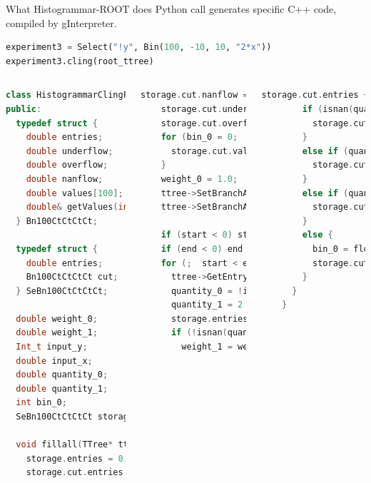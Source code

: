 \documentclass{beamer}
\begin{document}
\begin{frame}[fragile]{What Histogrammar-ROOT does}
\vspace{0.35 cm}
Python call generates specific C++ code, compiled by gInterpreter.

\begin{lstlisting}[language=python]
experiment3 = Select("!y", Bin(100, -10, 10, "2*x"))
experiment3.cling(root_ttree)
\end{lstlisting}

\begin{columns}
\begin{lstlisting}[language=cpp, basicstyle=\ttfamily\fontsize{5}{4}\selectfont]
class HistogrammarClingFiller_0 {
public:
  typedef struct {
    double entries;
    double underflow;
    double overflow;
    double nanflow;
    double values[100];
    double& getValues(int i) { return values[i]; }
  } Bn100CtCtCtCt;

  typedef struct {
    double entries;
    Bn100CtCtCtCt cut;
  } SeBn100CtCtCtCt;

  double weight_0;
  double weight_1;
  Int_t input_y;
  double input_x;
  double quantity_0;
  double quantity_1;
  int bin_0;
  SeBn100CtCtCtCt storage;

  void fillall(TTree* ttree, Long64_t start, Long64_t end) {
    storage.entries = 0.0;
    storage.cut.entries = 0.0;
\end{lstlisting}

\begin{lstlisting}[language=cpp, basicstyle=\ttfamily\fontsize{5}{4}\selectfont]
    storage.cut.nanflow = 0.0;
    storage.cut.underflow = 0.0;
    storage.cut.overflow = 0.0;
    for (bin_0 = 0;  bin_0 < 100;  ++bin_0) {
      storage.cut.values[bin_0] = 0.0;
    }
    weight_0 = 1.0;
    ttree->SetBranchAddress("x", &input_x);
    ttree->SetBranchAddress("y", &input_y);

    if (start < 0) start = 0;
    if (end < 0) end = ttree->GetEntries();
    for (;  start < end;  ++start) {
      ttree->GetEntry(start);
      quantity_0 = !input_y;
      quantity_1 = 2 * input_x;
      storage.entries += weight_0;
      if (!isnan(quantity_0)  &&  quantity_0 > 0.0) {
        weight_1 = weight_0 * quantity_0;
\end{lstlisting}

\begin{lstlisting}[language=cpp, basicstyle=\ttfamily\fontsize{5}{4}\selectfont]
        storage.cut.entries += weight_1;
        if (isnan(quantity_1)) {
          storage.cut.nanflow += weight_1;
        }
        else if (quantity_1 < -10.0) {
          storage.cut.underflow += weight_1;
        }
        else if (quantity_1 >= 10.0) {
          storage.cut.overflow += weight_1;
        }
        else {
          bin_0 = floor((quantity_1 - -10.0) * 5.0);
          storage.cut.values[bin_0] += weight_1;
        }
      }
    }


\end{lstlisting}
\end{columns}
\end{frame}
\end{document}

